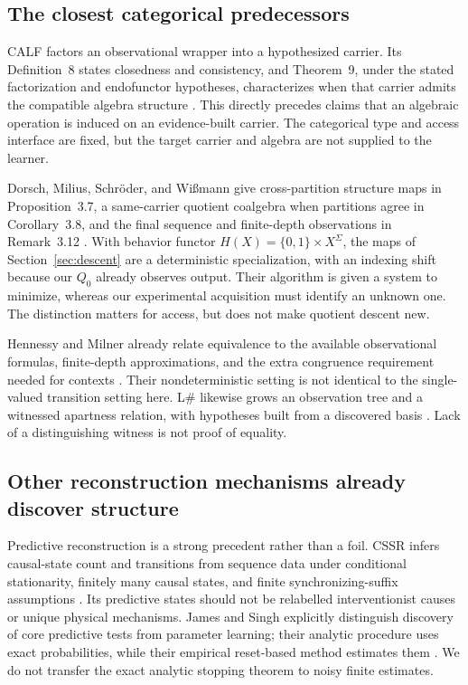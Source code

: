 \documentclass[11pt]{article}
\theoremstyle{remark}
\begin{document}
\subsection{The closest categorical predecessors}

CALF factors an observational wrapper into a hypothesized carrier. Its Definition~8 states closedness and consistency, and Theorem~9, under the stated factorization and endofunctor hypotheses, characterizes when that carrier admits the compatible algebra structure \cite{CALF}. This directly precedes claims that an algebraic operation is induced on an evidence-built carrier. The categorical type and access interface are fixed, but the target carrier and algebra are not supplied to the learner.

Dorsch, Milius, Schr\"oder, and Wi\ss mann give cross-partition structure maps in Proposition~3.7, a same-carrier quotient coalgebra when partitions agree in Corollary~3.8, and the final sequence and finite-depth observations in Remark~3.12 \cite{Dorsch}. With behavior functor $H(X)=\{0,1\}\times X^\Sigma$, the maps of Section~\ref{sec:descent} are a deterministic specialization, with an indexing shift because our $Q_0$ already observes output. Their algorithm is given a system to minimize, whereas our experimental acquisition must identify an unknown one. The distinction matters for access, but does not make quotient descent new.

Hennessy and Milner already relate equivalence to the available observational formulas, finite-depth approximations, and the extra congruence requirement needed for contexts \cite{HennessyMilner}. Their nondeterministic setting is not identical to the single-valued transition setting here. L\# likewise grows an observation tree and a witnessed apartness relation, with hypotheses built from a discovered basis \cite{Apartness}. Lack of a distinguishing witness is not proof of equality.

\subsection{Other reconstruction mechanisms already discover structure}

Predictive reconstruction is a strong precedent rather than a foil. CSSR infers causal-state count and transitions from sequence data under conditional stationarity, finitely many causal states, and finite synchronizing-suffix assumptions \cite{CSSR}. Its predictive states should not be relabelled interventionist causes or unique physical mechanisms. James and Singh explicitly distinguish discovery of core predictive tests from parameter learning; their analytic procedure uses exact probabilities, while their empirical reset-based method estimates them \cite{PSR}. We do not transfer the exact analytic stopping theorem to noisy finite estimates.
\end{document}
